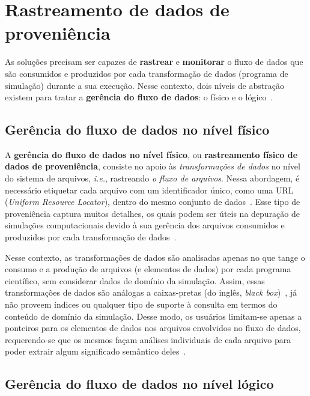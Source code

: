 \section{Rastreamento de dados de proveniência}%
\label{sec:rastreamento-de-dados-de-proveniencia}

As soluções precisam ser capazes de \textbf{rastrear} e \textbf{monitorar} o fluxo de dados que são consumidos e produzidos por cada transformação de dados (programa de simulação) durante a sua execução. Nesse contexto, dois níveis de abstração existem para tratar a \textbf{gerência do fluxo de dados}: o físico e o lógico~\cite{silva2015propostadoutorado}.

\subsection{Gerência do fluxo de dados no nível físico}%
\label{sec:gerencia-do-fluxo-de-dados-no-nivel-fisico}

A \textbf{gerência do fluxo de dados no nível físico}, ou \textbf{rastreamento físico de dados de proveniência}, consiste no apoio às \emph{transformações de dados} no nível do sistema de arquivos, \textit{i.e.}, rastreando \emph{o fluxo de arquivos}. Nessa abordagem, é necessário etiquetar cada arquivo com um identificador único, como uma URL (\textit{Uniform Resource Locator}), dentro do mesmo conjunto de dados~\cite{silva2015propostadoutorado}. Esse tipo de proveniência captura muitos detalhes, os quais podem ser úteis na depuração de simulações computacionais devido à sua gerência dos arquivos consumidos e produzidos por cada transformação de dados~\cite{silva2017raw}.

Nesse contexto, as transformações de dados são analisadas apenas no que tange o consumo e a produção de arquivos (e elementos de dados) por cada programa científico, sem considerar dados de domínio da simulação. Assim, essas transformações de dados são análogas a caixas-pretas (do inglês, \textit{black box})~\cite{silva2017raw}, já não proveem índices ou qualquer tipo de suporte à consulta em termos do conteúdo de domínio da simulação. Desse modo, os usuários limitam-se apenas a ponteiros para os elementos de dados nos arquivos envolvidos no fluxo de dados, requerendo-se que os mesmos façam análises individuais de cada arquivo para poder extrair algum significado semântico deles~\cite{silva2015propostadoutorado}.

\subsection{Gerência do fluxo de dados no nível lógico}%
\label{sec:gerencia-do-fluxo-de-dados-no-nivel-logico}

